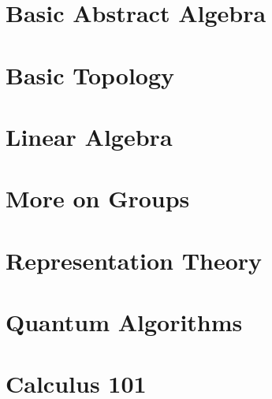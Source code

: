 \documentclass[11pt,twoside=semi,openright,numbers=noenddot,titlepage=false]{scrbook}
\begin{document}
\part{Basic Abstract Algebra}
\label{part:absalg}
\parttoc




\part{Basic Topology}
\label{part:basictop}
\parttoc




\part{Linear Algebra}
\label{part:linalg}
\parttoc








\part{More on Groups}
\label{part:groups}
\parttoc




\part{Representation Theory}
\label{part:repth}
\parttoc





\part{Quantum Algorithms}
\label{part:quantum}
\parttoc




\part{Calculus 101}
\label{part:calc}
\parttoc





\end{document}
